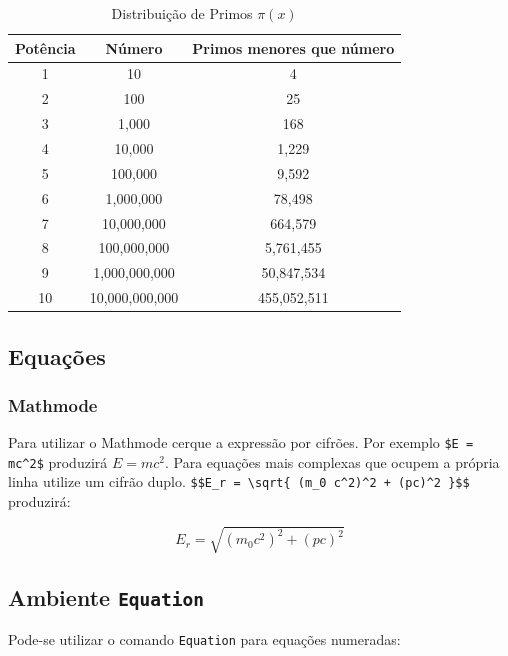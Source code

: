 \documentclass[11pt]{article}
\begin{document}
\begin{table}[!h]
\centering
\begin{tabular}{c|c|c}   %
\toprule
Potência   &    Número  & Primos menores que número  \\  \midrule
1  &    10      &   4                        \\
2  &	100 	&   25 	                     \\
3  &	1,000   &	168 	                 \\
4  &	10,000  &	1,229 	                 \\
5  &	100,000 &	9,592 	                 \\
6  &	1,000,000   & 	78,498 	             \\
7  &	10,000,000  &	664,579 	         \\
8  &	100,000,000 &	5,761,455 	         \\
9  &    1,000,000,000  &	50,847,534 	     \\
10 &	10,000,000,000 &	455,052,511      \\   \toprule \bottomrule
\end{tabular}
\caption{Distribuição de Primos $\pi(x)$} \label{tab:tabela}
\end{table}


\subsection{Equações}

\subsubsection{Mathmode}

Para utilizar o Mathmode cerque a expressão por cifrões. Por exemplo \verb!$E = mc^2$!  produzirá $E = mc^2$. Para equações mais complexas que ocupem a própria linha utilize um cifrão duplo. \verb!$$E_r = \sqrt{ (m_0 c^2)^2 + (pc)^2 }$$! produzirá:

$$E_r = \sqrt{ (m_0 c^2)^2 + (pc)^2 }$$

\subsection{Ambiente \texttt{Equation}}

Pode-se utilizar o comando \texttt{Equation} para equações numeradas:
\end{document}
